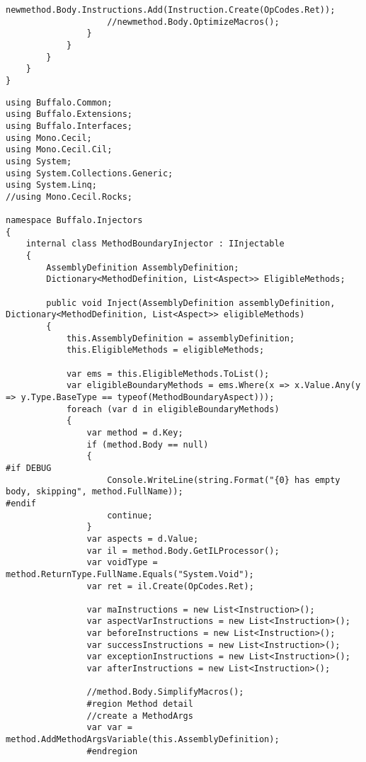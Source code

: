 \begin{lstlisting}[caption={../buffalo/Injectors/MethodAroundInjector.cs}, label=../buffalo/Injectors/MethodAroundInjector.cs, frame=tb, basicstyle=\scriptsize]
                    newmethod.Body.Instructions.Add(Instruction.Create(OpCodes.Ret));
                    //newmethod.Body.OptimizeMacros();
                }
            }
        }
    }
}
\end{lstlisting}

\begin{lstlisting}[caption={../buffalo/Injectors/MethodBoundaryInjector.cs}, label=../buffalo/Injectors/MethodBoundaryInjector.cs, frame=tb, basicstyle=\scriptsize]﻿using Buffalo.Common;
using Buffalo.Extensions;
using Buffalo.Interfaces;
using Mono.Cecil;
using Mono.Cecil.Cil;
using System;
using System.Collections.Generic;
using System.Linq;
//using Mono.Cecil.Rocks;

namespace Buffalo.Injectors
{
    internal class MethodBoundaryInjector : IInjectable
    {
        AssemblyDefinition AssemblyDefinition;
        Dictionary<MethodDefinition, List<Aspect>> EligibleMethods;

        public void Inject(AssemblyDefinition assemblyDefinition, Dictionary<MethodDefinition, List<Aspect>> eligibleMethods)
        {
            this.AssemblyDefinition = assemblyDefinition;
            this.EligibleMethods = eligibleMethods;

            var ems = this.EligibleMethods.ToList();
            var eligibleBoundaryMethods = ems.Where(x => x.Value.Any(y => y.Type.BaseType == typeof(MethodBoundaryAspect)));
            foreach (var d in eligibleBoundaryMethods)
            {
                var method = d.Key;
                if (method.Body == null)
                {
#if DEBUG
                    Console.WriteLine(string.Format("{0} has empty body, skipping", method.FullName));
#endif
                    continue;
                }
                var aspects = d.Value;
                var il = method.Body.GetILProcessor();
                var voidType = method.ReturnType.FullName.Equals("System.Void");
                var ret = il.Create(OpCodes.Ret);

                var maInstructions = new List<Instruction>();
                var aspectVarInstructions = new List<Instruction>();
                var beforeInstructions = new List<Instruction>();
                var successInstructions = new List<Instruction>();
                var exceptionInstructions = new List<Instruction>();
                var afterInstructions = new List<Instruction>();

                //method.Body.SimplifyMacros();
                #region Method detail
                //create a MethodArgs
                var var = method.AddMethodArgsVariable(this.AssemblyDefinition);
                #endregion


\end{lstlisting}

